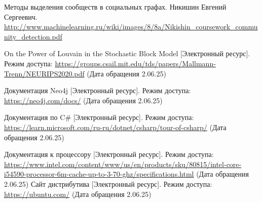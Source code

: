 \begin{thebibliography}{}
 Методы выделения сообществ в
социальных графах. Никишин Евгений Сергеевич. \url{http://www.machinelearning.ru/wiki/images/8/8a/Nikishin_coursework_community_detection.pdf}

 On the Power of Louvain in the Stochastic Block
Model [Электронный ресурс]. Режим доступа: \url{https://groups.csail.mit.edu/tds/papers/Mallmann-Trenn/NEURIPS2020.pdf} (Дата обращения 2.06.25)

 Документация Neo4j [Электронный ресурс]. Режим доступа: \url{https://neo4j.com/docs/} (Дата обращения 2.06.25)

 Документация по C\# [Электронный ресурс]. Режим доступа: \url{https://learn.microsoft.com/ru-ru/dotnet/csharp/tour-of-csharp/} (Дата обращения 2.06.25)

 Документация к процессору [Электронный ресурс]. Режим доступа: \url{https://www.intel.com/content/www/us/en/products/sku/80815/intel-core-i54590-processor-6m-cache-up-to-3-70-ghz/specifications.html} (Дата обращения 2.06.25)
	 Сайт дистрибутива [Электронный ресурс]. Режим доступа: \url{https://ubuntu.com/} (Дата обращения 2.06.25)
	
\end{thebibliography}